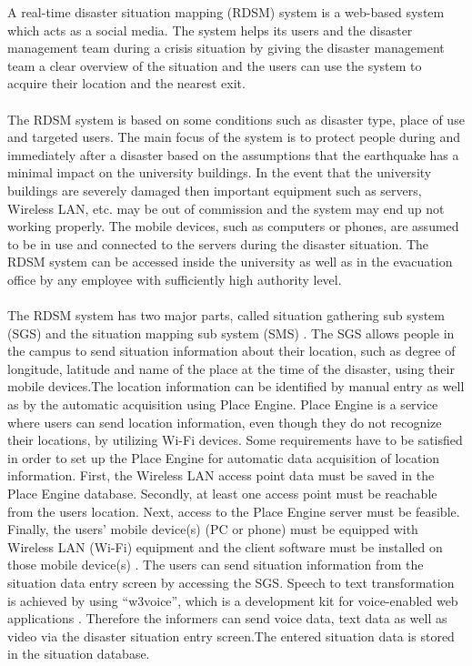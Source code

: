 A real-time disaster situation mapping (RDSM) system is a web-based system which acts as a social media. The system helps its users and the disaster management team during a crisis situation by giving the disaster management team a clear overview of the situation and the users can use the system to acquire their location and the nearest exit.
\\\\
The RDSM system is based on some conditions such as disaster type, place of use and targeted users. The main focus of the system is to protect people during and immediately after a disaster based on the assumptions that the earthquake has a minimal impact on the university buildings. In the event that the university buildings are severely damaged then important equipment such as servers, Wireless LAN, etc. may be out of commission and the system may end up not working properly. The mobile devices, such as computers or phones, are assumed to be in use and connected to the servers during the disaster situation. The RDSM system can be accessed inside the university as well as in the evacuation office by any employee with sufficiently high authority level.
\\\\
The RDSM system has two major parts, called situation gathering sub system (SGS) and the situation mapping sub system (SMS) \cite{springlink}. The SGS allows people in the campus to send situation information about their location, such as degree of longitude, latitude and name of the place at the time of the disaster, using their mobile devices.The location information can be identified by manual entry as well as by the automatic acquisition using Place Engine. Place Engine is a service where users can send location information, even though they do not recognize their locations, by utilizing Wi-Fi devices. Some requirements have to be satisfied in order to set up the Place Engine for automatic data acquisition of location information. First, the Wireless LAN access point data must be saved in the Place Engine database. Secondly, at least one access point must be reachable from the users  location. Next, access to the Place Engine server must be feasible. Finally, the users’ mobile device(s) (PC or phone) must be equipped with Wireless LAN (Wi-Fi) equipment and the client software must be installed on those mobile device(s) \cite{springlink}. The users can send situation information from the situation data entry screen by accessing the SGS. Speech to text transformation is achieved by using “w3voice”, which is a development kit for voice-enabled web applications \cite{springlink}. Therefore the informers can send voice data, text data as well as video via the disaster situation entry screen.The entered situation data is stored in the situation database. 
